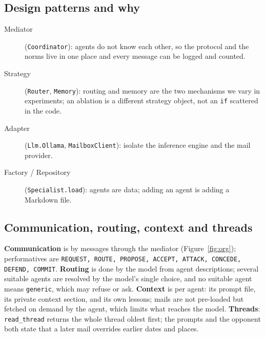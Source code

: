 \documentclass[11pt,a4paper]{article}
\newcommand{\code}[1]{\texttt{#1}}
\begin{document}
\subsection{Design patterns and why}
\begin{description}
  \item[Mediator] (\code{Coordinator}): agents do not know each other, so the protocol and the norms live in one
        place and every message can be logged and counted.
  \item[Strategy] (\code{Router}, \code{Memory}): routing and memory are the two mechanisms we vary in experiments;
        an ablation is a different strategy object, not an \code{if} scattered in the code.
  \item[Adapter] (\code{Llm.Ollama}, \code{MailboxClient}): isolate the inference engine and the mail provider.
  \item[Factory / Repository] (\code{Specialist.load}): agents are data; adding an agent is adding a Markdown file.
\end{description}

\subsection{Communication, routing, context and threads}
\textbf{Communication} is by messages through the mediator (Figure~\ref{fig:org}); performatives are
\code{REQUEST, ROUTE, PROPOSE, ACCEPT, ATTACK, CONCEDE, DEFEND, COMMIT}.
\textbf{Routing} is done by the model from agent descriptions; several suitable agents are resolved by the model's
single choice, and no suitable agent means \code{generic}, which may refuse or ask.
\textbf{Context} is per agent: its prompt file, its private context section, and its own lessons; mails are not
pre-loaded but fetched on demand by the agent, which limits what reaches the model.
\textbf{Threads}: \code{read\_thread} returns the whole thread oldest first; the prompts and the opponent both state
that a later mail overrides earlier dates and places.
\end{document}
